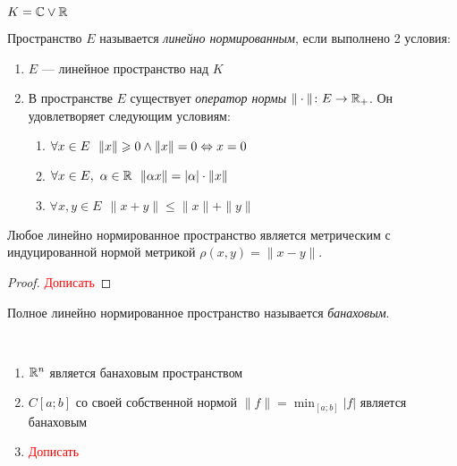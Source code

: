 \textcolor{red}{$K = \mathbb{C} \vee \mathbb{R}$}

\begin{definition}
	Пространство $E$ называется \textit{линейно нормированным}, если выполнено 2 условия:
	\begin{enumerate}
		\item $E$ --- линейное пространство над $K$
		
		\item В пространстве $E$ существует \textit{оператор нормы} $\|\cdot\| \colon E \to \mathbb{R}_+$. Он удовлетворяет следующим условиям:
		\begin{enumerate}
			\item $\forall x \in E\ \ \|x\| \geqslant 0 \wedge \|x\| = 0 \Leftrightarrow x = 0$
			
			\item $\forall x \in E,\ \alpha \in \R\ \ \|\alpha x\| = |\alpha| \cdot \|x\|$
			
			\item $\forall x, y \in E\ \ \|x  + y\| \le \|x\| + \|y\|$
		\end{enumerate}
	\end{enumerate}
\end{definition}

\begin{proposition}
	Любое линейно нормированное пространство является метрическим с индуцированной нормой метрикой $\rho(x, y) = \|x - y\|$.
\end{proposition}

\begin{proof}
	\textcolor{red}{Дописать}
\end{proof}

\begin{definition}
	Полное линейно нормированное пространство называется \textit{банаховым}.
\end{definition}

\begin{example}~
	\begin{enumerate}
		\item $\mathbb{R}^n$ является банаховым пространством
		
		\item $C[a; b]$ со своей собственной нормой $\|f\| = \min_{[a; b]} |f|$ является банаховым
		
		\item \textcolor{red}{Дописать}
	\end{enumerate}
\end{example}

